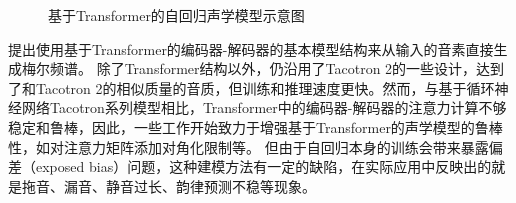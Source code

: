\begin{figure}[htbp]
  \caption{基于Transformer的自回归声学模型示意图}
\end{figure}
\citet{transformertts}提出使用基于Transformer的编码器-解码器的基本模型结构来从输入的音素直接生成梅尔频谱。
\citet{transformertts}除了Transformer结构以外，仍沿用了Tacotron 2的一些设计，达到了和Tacotron 2的相似质量的音质，但训练和推理速度更快。然而，与基于循环神经网络Tacotron系列模型相比，Transformer中的编码器-解码器的注意力计算不够稳定和鲁棒，因此，一些工作开始致力于增强基于Transformer的声学模型的鲁棒性，如对注意力矩阵添加对角化限制\citep{robutrans}等。
但由于自回归本身的训练会带来暴露偏差（exposed bias）问题，这种建模方法有一定的缺陷，在实际应用中反映出的就是拖音、漏音、静音过长、韵律预测不稳等现象。

